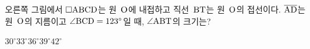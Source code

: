 \noindent\begin{minipage}[t]{0.58\linewidth}\vspace{0pt}\raggedright 오른쪽 그림에서 $\square\mathrm{ABCD}$는 원~$\mathrm{O}$에 내접하고 직선~$\mathrm{BT}$는 원~$\mathrm{O}$의 접선이다. $\overline{\mathrm{AD}}$는 원~$\mathrm{O}$의 지름이고 $\angle\mathrm{BCD}=123^\circ$일 때, $\angle\mathrm{ABT}$의 크기는?\end{minipage}\hfill\begin{minipage}[t]{0.4\linewidth}\vspace{0pt}\centering \resizebox{\ifdim\width>\linewidth\linewidth\else\width\fi}{!}{}\end{minipage}\par
\begin{choices32}{$30^\circ$}{$33^\circ$}{$36^\circ$}{$39^\circ$}{$42^\circ$}\end{choices32}
